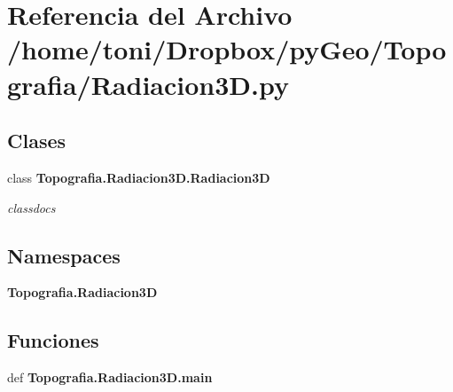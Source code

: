 \section{Referencia del Archivo /home/toni/\-Dropbox/py\-Geo/\-Topografia/\-Radiacion3\-D.py}
\label{Radiacion3D_8py}
\subsection*{Clases}
\begin{DoxyCompactItemize}
\item 
class {\bf Topografia.\-Radiacion3\-D.\-Radiacion3\-D}
\begin{DoxyCompactList}\small\item\em classdocs \end{DoxyCompactList}\end{DoxyCompactItemize}
\subsection*{Namespaces}
\begin{DoxyCompactItemize}
\item 
{\bf Topografia.\-Radiacion3\-D}
\end{DoxyCompactItemize}
\subsection*{Funciones}
\begin{DoxyCompactItemize}
\item 
def {\bf Topografia.\-Radiacion3\-D.\-main}
\end{DoxyCompactItemize}
